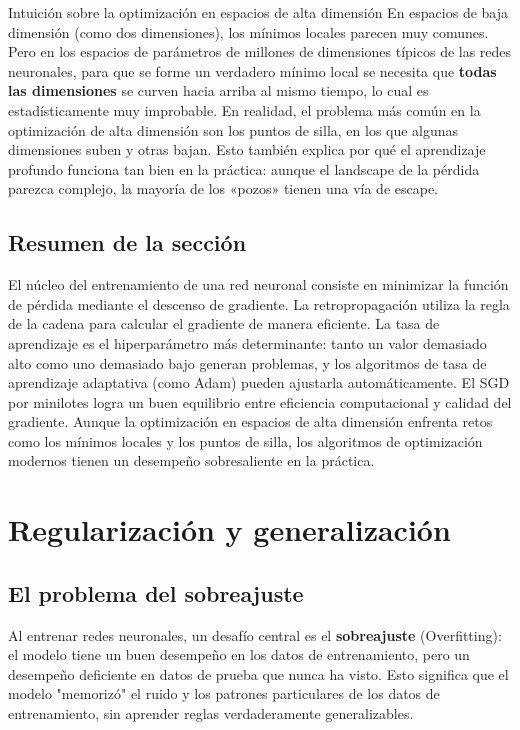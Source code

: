 \documentclass[a4paper]{article}
\begin{document}
\begin{knowledgebox}{Intuición sobre la optimización en espacios de alta dimensión}
En espacios de baja dimensión (como dos dimensiones), los mínimos locales parecen muy comunes. Pero en los espacios de parámetros de millones de dimensiones típicos de las redes neuronales, para que se forme un verdadero mínimo local se necesita que \textbf{todas las dimensiones} se curven hacia arriba al mismo tiempo, lo cual es estadísticamente muy improbable. En realidad, el problema más común en la optimización de alta dimensión son los puntos de silla, en los que algunas dimensiones suben y otras bajan. Esto también explica por qué el aprendizaje profundo funciona tan bien en la práctica: aunque el landscape de la pérdida parezca complejo, la mayoría de los «pozos» tienen una vía de escape.
\end{knowledgebox}

\subsection{Resumen de la sección}

El núcleo del entrenamiento de una red neuronal consiste en minimizar la función de pérdida mediante el descenso de gradiente. La retropropagación utiliza la regla de la cadena para calcular el gradiente de manera eficiente. La tasa de aprendizaje es el hiperparámetro más determinante: tanto un valor demasiado alto como uno demasiado bajo generan problemas, y los algoritmos de tasa de aprendizaje adaptativa (como Adam) pueden ajustarla automáticamente. El SGD por minilotes logra un buen equilibrio entre eficiencia computacional y calidad del gradiente. Aunque la optimización en espacios de alta dimensión enfrenta retos como los mínimos locales y los puntos de silla, los algoritmos de optimización modernos tienen un desempeño sobresaliente en la práctica.
\section{Regularización y generalización}

\subsection{El problema del sobreajuste}

Al entrenar redes neuronales, un desafío central es el \textbf{sobreajuste} (Overfitting): el modelo tiene un buen desempeño en los datos de entrenamiento, pero un desempeño deficiente en datos de prueba que nunca ha visto. Esto significa que el modelo "memorizó" el ruido y los patrones particulares de los datos de entrenamiento, sin aprender reglas verdaderamente generalizables.
\end{document}
